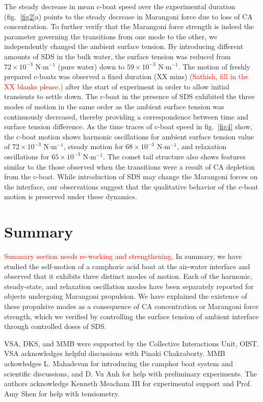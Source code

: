\documentclass[journal=langd5, manuscript=article, layout=twocolumn]{achemso}
\begin{document}
The steady decrease in mean c-boat speed over the experimental duration (fig.~\ref{fig2}a) points to the steady decrease in Marangoni force due to loss of CA concentration. To further verify that the Marangoni force strength is indeed the parameter governing the transitions from one mode to the other, we independently changed the ambient surface tension. By introducing different amounts of SDS in the bulk water, the surface tension was reduced from $72\times 10^{-3}$ N$\cdot$m$^{-1}$ (pure water) down to $59\times 10^{-3}$ N$\cdot$m$^{-1}$. The motion of  freshly prepared c-boats was observed a fixed duration (XX mins) \textcolor{red}{(Sathish, fill in the XX blanks please.)} after the start of experiment in order to allow initial transients to settle down. The c-boat in the presence of SDS exhibited the three modes of motion in the same order as the ambient surface tension was continuously decreased, thereby providing a correspondence between time and surface tension difference. As the time traces of c-boat speed in fig.~\ref{fig4} show, the c-boat motion shows harmonic oscillations for ambient surface tension value of $72\times 10^{-3}$ N$\cdot$m$^{-1}$, steady motion for $68\times 10^{-3}$ N$\cdot$m$^{-1}$, and relaxation oscillations for $65\times 10^{-3}$ N$\cdot$m$^{-1}$. The comet tail structure also shows features similar to the those observed when the transitions were a result of CA depletion from the c-boat. While introduction of SDS may change the Marangoni forces on the interface, our observations suggest that the qualitative behavior of the c-boat motion is preserved under these dynamics.

\section{Summary}
\textcolor{red}{Summary section needs re-working and strengthening.} In summary, we have studied the self-motion of a camphoric acid boat at the air-water interface and observed that it exhibits three distinct modes of motion. Each of the harmonic, steady-state, and relaxation oscillation modes have been separately reported for objects undergoing Marangoni propulsion. We have explained the existence of these propulsive modes as a consequence of CA concentration or Marangoni force strength, which we verified by controlling the surface tension of ambient interface through controlled doses of SDS.

\begin{acknowledgement}
VSA, DKS, and MMB were supported by the Collective Interactions Unit, OIST. VSA acknowledges helpful discussions with Pinaki Chakraborty. MMB ackowledges L. Mahadevan for introducing the camphor boat system and scientific discussions, and D. Vu Anh for help with preliminary experiments. The authors acknowledge Kenneth Meacham III for experimental support and Prof. Amy Shen for help with tensiometry. 
\end{acknowledgement}
\end{document}
